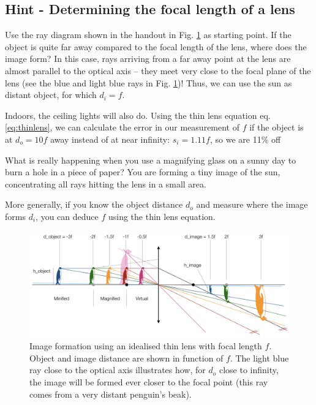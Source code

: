 \documentclass[a4paper]{report}
\begin{document}
    \clearpage


    \subsection{Hint - Determining the focal length of a lens}
	\hypertarget{hintTo-focal_length}{}
    Use the ray diagram shown in the handout in Fig. \ref{fig:imageforming} as starting point.
    If the object is quite far away compared to the focal length of the lens, where does the image form?
    In this case, rays arriving from a far away point at the lens are almost parallel to the optical axis -- they meet very close to the focal plane of the lens (see the blue and light blue rays in Fig. \ref{fig:imageforming})!
    Thus, we can use the sun as distant object, for which $d_i = f$.

    Indoors, the ceiling lights will also do. Using the thin lens equation eq. \ref{eq:thinlens}, we can calculate the error in our measurement of $f$ if the object is at $d_o = 10f$ away instead of at near infinity: $s_i = 1.11f$, so we are 11\% off

    What is really happening when you use a magnifying glass on a sunny day to burn a hole in a piece of paper? You are forming a tiny image of the sun, concentrating all rays hitting the lens in a small area.

    More generally, if you know the object distance $d_o$ and measure where the image forms $d_i$, you can deduce $f$ using the thin lens equation.

	\begin{figure}[h]
		\center
		\includegraphics[width=1\textwidth]{figures/penguin_lens.png}
		\captionsetup{width=0.95\textwidth}
		\caption{Image formation using an idealised thin lens with focal length $f$. Object and image distance are shown in function of $f$.
		The light blue ray close to the optical axis illustrates how, for $d_o$ close to infinity, the image will be formed ever closer to the focal point (this ray comes from a very distant penguin's beak).
		}
		\label{fig:imageforming}
	\end{figure}
\end{document}
